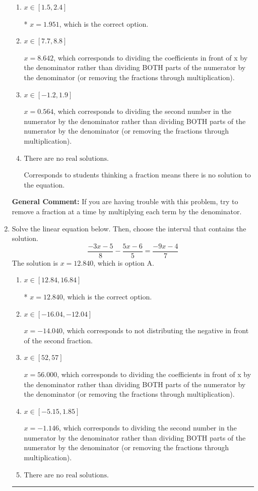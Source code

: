 \documentclass{extbook}[14pt]
\newcommand{\litem}[1]{\item #1

\rule{\textwidth}{0.4pt}}
\begin{document}
\begin{enumerate}
{\begin{enumerate}[label=\Alph*.]
 $x = 4.716$, which corresponds to not distributing the negative in front of the second fraction.
\item \( x \in [1.5, 2.4] \)

* $x = 1.951$, which is the correct option.
\item \( x \in [7.7, 8.8] \)

 $x = 8.642$, which corresponds to dividing the coefficients in front of x by the denominator rather than dividing BOTH parts of the numerator by the denominator (or removing the fractions through multiplication).
\item \( x \in [-1.2, 1.9] \)

 $x = 0.564$, which corresponds to dividing the second number in the numerator by the denominator rather than dividing BOTH parts of the numerator by the denominator (or removing the fractions through multiplication).
\item \( \text{There are no real solutions.} \)

Corresponds to students thinking a fraction means there is no solution to the equation.
\end{enumerate}

\textbf{General Comment:} If you are having trouble with this problem, try to remove a fraction at a time by multiplying each term by the denominator.
}
\litem{
Solve the linear equation below. Then, choose the interval that contains the solution.
\[ \frac{-3x -5}{8} - \frac{5x -6}{5} = \frac{-9x -4}{7} \]The solution is \( x = 12.840 \), which is option A.\begin{enumerate}[label=\Alph*.]
\item \( x \in [12.84, 16.84] \)

* $x = 12.840$, which is the correct option.
\item \( x \in [-16.04, -12.04] \)

 $x = -14.040$, which corresponds to not distributing the negative in front of the second fraction.
\item \( x \in [52, 57] \)

 $x = 56.000$, which corresponds to dividing the coefficients in front of x by the denominator rather than dividing BOTH parts of the numerator by the denominator (or removing the fractions through multiplication).
\item \( x \in [-5.15, 1.85] \)

 $x = -1.146$, which corresponds to dividing the second number in the numerator by the denominator rather than dividing BOTH parts of the numerator by the denominator (or removing the fractions through multiplication).
\item \( \text{There are no real solutions.} \)


\end{enumerate}}
\end{enumerate}
\end{document}
